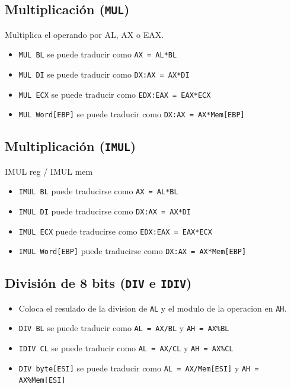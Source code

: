 \documentclass[12pt]{article}
\begin{document}
\subsection*{Multiplicación (\texttt{MUL})}
\label{sec:orgec1c8b6}
Multiplica el operando por AL, AX o EAX.
\begin{itemize}
\item \texttt{MUL BL} se puede traducir como \texttt{AX = AL*BL}
\item \texttt{MUL DI} se puede traducir como \texttt{DX:AX = AX*DI}
\item \texttt{MUL ECX} se puede traducir como \texttt{EDX:EAX = EAX*ECX}
\item \texttt{MUL Word[EBP]} se puede traducir como \texttt{DX:AX = AX*Mem[EBP]}
\end{itemize}

\subsection*{Multiplicación (\texttt{IMUL})}
\label{sec:org83f1258}
IMUL reg / IMUL mem
\begin{itemize}
\item \texttt{IMUL BL} puede traducirse como \texttt{AX = AL*BL}
\item \texttt{IMUL DI} puede traducirse como \texttt{DX:AX = AX*DI}
\item \texttt{IMUL ECX} puede traducirse como \texttt{EDX:EAX = EAX*ECX}
\item \texttt{IMUL Word[EBP]} puede traducirse como \texttt{DX:AX = AX*Mem[EBP]}
\end{itemize}

\subsection*{División de 8 bits (\texttt{DIV} e \texttt{IDIV})}
\label{sec:orgbfc98d8}
\begin{itemize}
\item Coloca el resulado de la division de \texttt{AL} y el modulo de la operacion en \texttt{AH}.
\item \texttt{DIV BL} se puede traducir como \texttt{AL = AX/BL} y \texttt{AH = AX\%BL}
\item \texttt{IDIV CL} se puede traducir como \texttt{AL = AX/CL} y \texttt{AH = AX\%CL}
\item \texttt{DIV byte[ESI]} se puede traducir como \texttt{AL = AX/Mem[ESI]} y \texttt{AH = AX\%Mem[ESI]}
\end{itemize}
\end{document}

